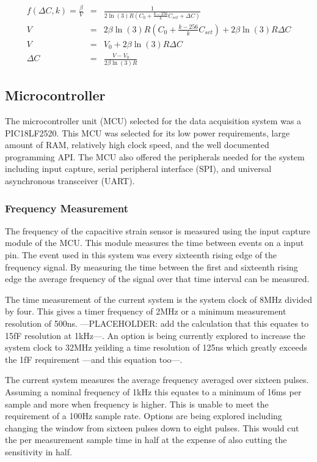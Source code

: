 \begin{eqnarray}
	f(\Delta C, k)=\frac{\beta}{V}&=&\frac{1}{2\ln(3)R(C_0+\frac{k-256}{k}C_{set}+\Delta C)}\\
	V&=&2\beta\ln(3)R\left(C_0+\frac{k-256}{k}C_{set}\right)+2\beta\ln(3)R\Delta C\\
	V&=&V_0+2\beta\ln(3)R\Delta C\\
	\Delta C&=&\frac{V-V_0}{2\beta\ln(3)R}\label{daq-val-to-cap}
\end{eqnarray}

\subsection{Microcontroller}
The microcontroller unit (MCU) selected for the data acquisition system was a PIC18LF2520.  This MCU was selected for its low power requirements, large amount of RAM, relatively high clock speed, and the well documented programming API.  The MCU also offered the peripherals needed for the system including input capture, serial peripheral interface (SPI), and universal asynchronous transceiver (UART).  

\subsubsection{Frequency Measurement}
The frequency of the capacitive strain sensor is measured using the input capture module of the MCU.  This module measures the time between events on a input pin.  The event used in this system was every sixteenth rising edge of the frequency signal.  By measuring the time between the first and sixteenth rising edge the average frequency of the signal over that time interval can be measured.

The time measurement of the current system is the system clock of 8MHz divided by four.  This gives a timer frequency of 2MHz or a minimum measurement resolution of 500ns.  ---PLACEHOLDER: add the calculation that this equates to 15fF resolution at 1kHz---.  An option is being currently explored to increase the system clock to 32MHz yeilding a time resolution of 125ns which greatly exceeds the 1fF requirement ---and this equation too---.   

The current system measures the average frequency averaged over sixteen pulses.  Assuming a nominal frequency of 1kHz this equates to a minimum of 16ms per sample and more when frequency is higher.  This is unable to meet the requirement of a 100Hz sample rate.   Options are being explored including changing the window from sixteen pulses down to eight pulses.  This would cut the per measurement sample time in half at the expense of also cutting the sensitivity in half.

